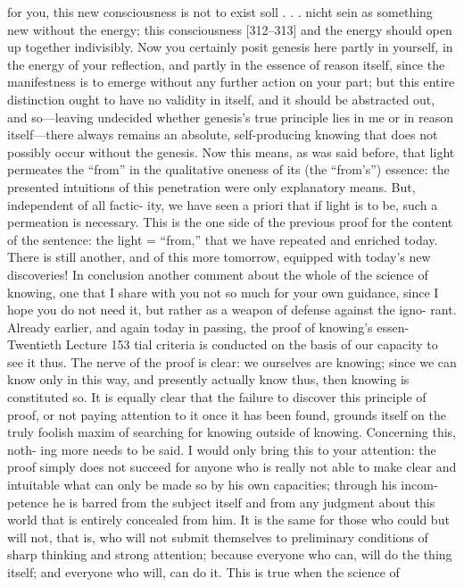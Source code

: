 for you, this new consciousness is not to exist {soll . . . nicht sein} as something
new without the energy; this consciousness [312–313] and the energy should
open up together indivisibly. Now you certainly posit genesis here partly in
yourself, in the energy of your reflection, and partly in the essence of reason
itself, since the manifestness is to emerge without any further action on your
part; but this entire distinction ought to have no validity in itself, and it should
be abstracted out, and so—leaving undecided whether genesis’s true principle
lies in me or in reason itself—there always remains an absolute, self-producing
knowing that does not possibly occur without the genesis.
Now this means, as was said before, that light permeates the “from” in
the qualitative oneness of its (the “from’s”) essence: the presented intuitions of
this penetration were only explanatory means. But, independent of all factic-
ity, we have seen a priori that if light is to be, such a permeation is necessary.
This is the one side of the previous proof for the content of the sentence:
the light = “from,” that we have repeated and enriched today. There is still
another, and of this more tomorrow, equipped with today’s new discoveries!
In conclusion another comment about the whole of the science of
knowing, one that I share with you not so much for your own guidance, since
I hope you do not need it, but rather as a weapon of defense against the igno-
rant. Already earlier, and again today in passing, the proof of knowing’s essen-Twentieth Lecture
153
tial criteria is conducted on the basis of our capacity to see it thus. The nerve
of the proof is clear: we ourselves are knowing; since we can know only in this
way, and presently actually know thus, then knowing is constituted so. It is
equally clear that the failure to discover this principle of proof, or not paying
attention to it once it has been found, grounds itself on the truly foolish
maxim of searching for knowing outside of knowing. Concerning this, noth-
ing more needs to be said. I would only bring this to your attention: the proof
simply does not succeed for anyone who is really not able to make clear and
intuitable what can only be made so by his own capacities; through his incom-
petence he is barred from the subject itself and from any judgment about this
world that is entirely concealed from him. It is the same for those who could
but will not, that is, who will not submit themselves to preliminary conditions
of sharp thinking and strong attention; because everyone who can, will do the
thing itself; and everyone who will, can do it. This is true when the science of
